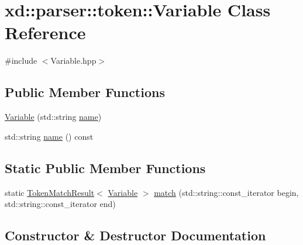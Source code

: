 \hypertarget{classxd_1_1parser_1_1token_1_1_variable}{}\section{xd\+:\+:parser\+:\+:token\+:\+:Variable Class Reference}
\label{classxd_1_1parser_1_1token_1_1_variable}


{\ttfamily \#include $<$Variable.\+hpp$>$}

\subsection*{Public Member Functions}
\begin{DoxyCompactItemize}
\item 
\mbox{\hyperlink{classxd_1_1parser_1_1token_1_1_variable_ac432ad5f3a917ee3abd9ea4d11716aed}{Variable}} (std\+::string \mbox{\hyperlink{classxd_1_1parser_1_1token_1_1_variable_a12b4673d212c5b7b8ac9bca8efa61775}{name}})
\item 
std\+::string \mbox{\hyperlink{classxd_1_1parser_1_1token_1_1_variable_a12b4673d212c5b7b8ac9bca8efa61775}{name}} () const
\end{DoxyCompactItemize}
\subsection*{Static Public Member Functions}
\begin{DoxyCompactItemize}
\item 
static \mbox{\hyperlink{namespacexd_1_1parser_1_1token_a766c52bbfb7cb1f08498ef0bb9ec756e}{Token\+Match\+Result}}$<$ \mbox{\hyperlink{classxd_1_1parser_1_1token_1_1_variable}{Variable}} $>$ \mbox{\hyperlink{classxd_1_1parser_1_1token_1_1_variable_a396dddf497f54896eba05baa21ac8782}{match}} (std\+::string\+::const\+\_\+iterator begin, std\+::string\+::const\+\_\+iterator end)
\end{DoxyCompactItemize}


\subsection{Constructor \& Destructor Documentation}
\mbox{\label{classxd_1_1parser_1_1token_1_1_variable_ac432ad5f3a917ee3abd9ea4d11716aed}} 
